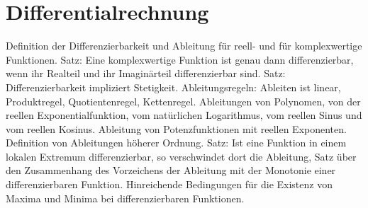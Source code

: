 \section{Differentialrechnung}
 
Definition der Differenzierbarkeit und Ableitung für reell- und für komplexwertige Funktionen. Satz: Eine komplexwertige Funktion ist genau dann differenzierbar, wenn ihr Realteil und ihr Imaginärteil differenzierbar sind. Satz: Differenzierbarkeit impliziert Stetigkeit. Ableitungsregeln: Ableiten ist linear, Produktregel, Quotientenregel, Kettenregel. Ableitungen von Polynomen, von der reellen Exponentialfunktion, vom natürlichen Logarithmus, vom reellen Sinus und vom reellen Kosinus. Ableitung von Potenzfunktionen mit reellen Exponenten. Definition von Ableitungen höherer Ordnung. Satz: Ist eine Funktion in einem lokalen Extremum differenzierbar, so verschwindet dort die Ableitung, Satz über den Zusammenhang des Vorzeichens der Ableitung mit der Monotonie einer differenzierbaren Funktion. Hinreichende Bedingungen für die Existenz von Maxima und Minima bei differenzierbaren Funktionen. 